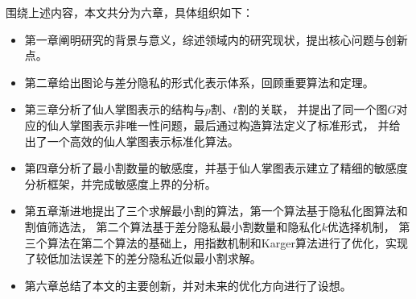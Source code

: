 围绕上述内容，本文共分为六章，具体组织如下：
\begin{itemize}
    \item 第一章阐明研究的背景与意义，综述领域内的研究现状，提出核心问题与创新点。
    \item 第二章给出图论与差分隐私的形式化表示体系，回顾重要算法和定理。
    \item 第三章分析了仙人掌图表示的结构与$p$割、$t$割的关联，
    并提出了同一个图$G$对应的仙人掌图表示非唯一性问题，最后通过构造算法定义了标准形式，
    并给出了一个高效的仙人掌图表示标准化算法。
    \item 第四章分析了最小割数量的敏感度，并基于仙人掌图表示建立了精细的敏感度分析框架，并完成敏感度上界的分析。
    \item 第五章渐进地提出了三个求解最小割的算法，第一个算法基于隐私化图算法和割值筛选法，
    第二个算法基于差分隐私最小割数量和隐私化$k$优选择机制，
    第三个算法在第二个算法的基础上，用指数机制和Karger算法进行了优化，实现了较低加法误差下的差分隐私近似最小割求解。
    \item 第六章总结了本文的主要创新，并对未来的优化方向进行了设想。
\end{itemize}


